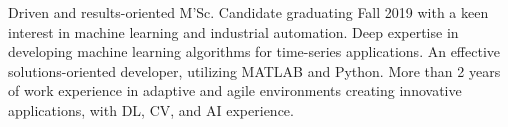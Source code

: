 

\begin{cvparagraph}

Driven and results-oriented M'Sc. Candidate graduating Fall 2019 with a keen interest in machine learning and industrial automation. Deep expertise in developing machine learning algorithms for time-series applications. An effective solutions-oriented developer, utilizing MATLAB and Python. More than 2 years of work experience in adaptive and agile environments creating innovative applications, with DL, CV, and AI experience.
\end{cvparagraph}
